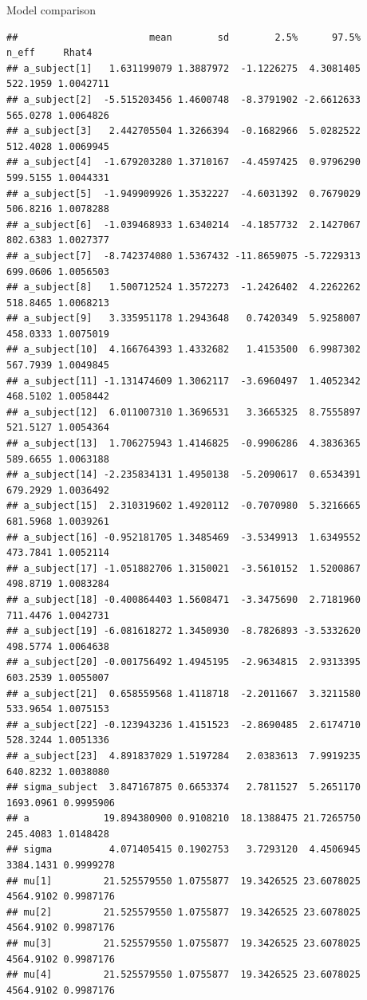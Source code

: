 \documentclass[
  ignorenonframetext,
]{beamer}
\begin{document}
\begin{frame}[fragile]{Model comparison}
\begin{verbatim}
##                       mean        sd        2.5%      97.5%     n_eff     Rhat4
## a_subject[1]   1.631199079 1.3887972  -1.1226275  4.3081405  522.1959 1.0042711
## a_subject[2]  -5.515203456 1.4600748  -8.3791902 -2.6612633  565.0278 1.0064826
## a_subject[3]   2.442705504 1.3266394  -0.1682966  5.0282522  512.4028 1.0069945
## a_subject[4]  -1.679203280 1.3710167  -4.4597425  0.9796290  599.5155 1.0044331
## a_subject[5]  -1.949909926 1.3532227  -4.6031392  0.7679029  506.8216 1.0078288
## a_subject[6]  -1.039468933 1.6340214  -4.1857732  2.1427067  802.6383 1.0027377
## a_subject[7]  -8.742374080 1.5367432 -11.8659075 -5.7229313  699.0606 1.0056503
## a_subject[8]   1.500712524 1.3572273  -1.2426402  4.2262262  518.8465 1.0068213
## a_subject[9]   3.335951178 1.2943648   0.7420349  5.9258007  458.0333 1.0075019
## a_subject[10]  4.166764393 1.4332682   1.4153500  6.9987302  567.7939 1.0049845
## a_subject[11] -1.131474609 1.3062117  -3.6960497  1.4052342  468.5102 1.0058442
## a_subject[12]  6.011007310 1.3696531   3.3665325  8.7555897  521.5127 1.0054364
## a_subject[13]  1.706275943 1.4146825  -0.9906286  4.3836365  589.6655 1.0063188
## a_subject[14] -2.235834131 1.4950138  -5.2090617  0.6534391  679.2929 1.0036492
## a_subject[15]  2.310319602 1.4920112  -0.7070980  5.3216665  681.5968 1.0039261
## a_subject[16] -0.952181705 1.3485469  -3.5349913  1.6349552  473.7841 1.0052114
## a_subject[17] -1.051882706 1.3150021  -3.5610152  1.5200867  498.8719 1.0083284
## a_subject[18] -0.400864403 1.5608471  -3.3475690  2.7181960  711.4476 1.0042731
## a_subject[19] -6.081618272 1.3450930  -8.7826893 -3.5332620  498.5774 1.0064638
## a_subject[20] -0.001756492 1.4945195  -2.9634815  2.9313395  603.2539 1.0055007
## a_subject[21]  0.658559568 1.4118718  -2.2011667  3.3211580  533.9654 1.0075153
## a_subject[22] -0.123943236 1.4151523  -2.8690485  2.6174710  528.3244 1.0051336
## a_subject[23]  4.891837029 1.5197284   2.0383613  7.9919235  640.8232 1.0038080
## sigma_subject  3.847167875 0.6653374   2.7811527  5.2651170 1693.0961 0.9995906
## a             19.894380900 0.9108210  18.1388475 21.7265750  245.4083 1.0148428
## sigma          4.071405415 0.1902753   3.7293120  4.4506945 3384.1431 0.9999278
## mu[1]         21.525579550 1.0755877  19.3426525 23.6078025 4564.9102 0.9987176
## mu[2]         21.525579550 1.0755877  19.3426525 23.6078025 4564.9102 0.9987176
## mu[3]         21.525579550 1.0755877  19.3426525 23.6078025 4564.9102 0.9987176
## mu[4]         21.525579550 1.0755877  19.3426525 23.6078025 4564.9102 0.9987176

\end{verbatim}
\end{frame}
\end{document}
